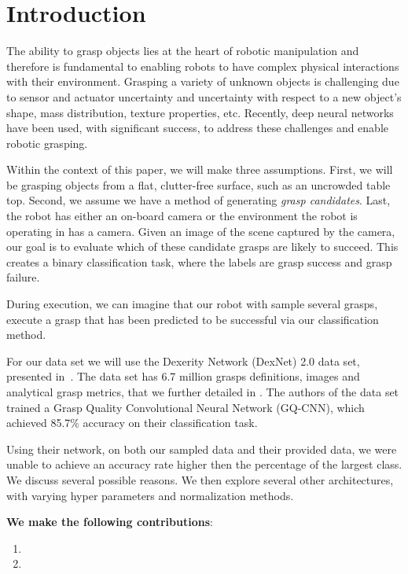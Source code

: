 
\section{Introduction}
\label{sec:intro}

The ability to grasp objects lies at the heart of robotic manipulation and therefore is fundamental to enabling robots to have complex physical interactions with their environment. 
Grasping a variety of unknown objects is challenging due to sensor and actuator uncertainty and uncertainty with respect to a new object's shape, mass distribution, texture properties, etc. 
Recently, deep neural networks have been used, with significant success, to address these challenges and enable robotic grasping. 

Within the context of this paper, we will make three assumptions. 
First, we will be grasping objects from a flat, clutter-free surface, such as an uncrowded table top. 
Second, we assume we have a method of generating \textit{grasp candidates}. 
Last, the robot has either an on-board camera or the environment the robot is operating in has a camera. 
Given an image of the scene captured by the camera, our goal is to evaluate which of these candidate grasps are likely to succeed. 
This creates a binary classification task, where the labels are grasp success and grasp failure. 

During execution, we can imagine that our robot with sample several grasps, execute a grasp that has been predicted to be successful via our classification method.  

For our data set we will use the Dexerity Network (DexNet) 2.0 data set, presented in~\cite{mahler2017dex}. 
The data set has 6.7 million grasps definitions, images and analytical grasp metrics, that we further detailed in . 
The authors of the data set trained a Grasp Quality Convolutional Neural Network (GQ-CNN), which achieved 85.7\% accuracy on their classification task.

Using their network, on both our sampled data and their provided data, we were unable to achieve an accuracy rate higher then the percentage of the largest class. We discuss several possible reasons. We then explore several other architectures, with varying hyper parameters and normalization methods. 

\textbf{We make the following contributions}:
\begin{enumerate}
    \item {}
		\item {}
\end{enumerate}

